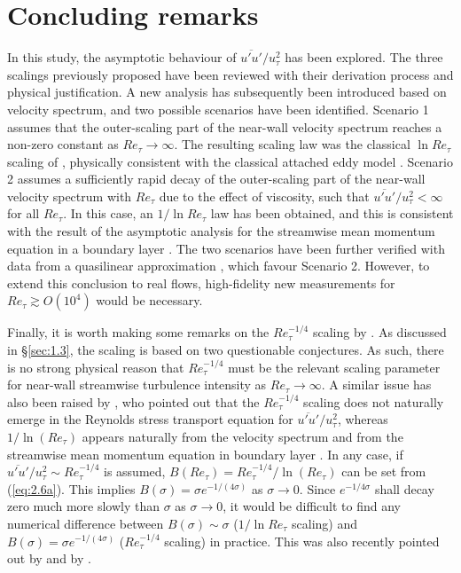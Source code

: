 \documentclass{jfm}
\begin{document}
\section{Concluding remarks}\label{sec:5}
In this study, the asymptotic behaviour of $\overline{u'u'}/u_\tau^2$ has been explored. The three scalings previously proposed \cite[]{Marusic2003,Monkewitz2015,Chen2021} have been reviewed with their derivation process and physical justification. A new analysis has subsequently been introduced based on velocity spectrum, and two possible scenarios have been identified. Scenario 1 assumes that the outer-scaling part of the near-wall velocity spectrum reaches a non-zero constant as $Re_\tau \rightarrow \infty$. The resulting scaling law was the classical $\ln Re_\tau$ scaling of \cite{Marusic2003}, physically consistent with the classical attached eddy model \cite[]{Townsend1976,Perry1986}. Scenario 2 assumes a sufficiently rapid decay of the outer-scaling part of the near-wall velocity spectrum with $Re_\tau$ due to the effect of viscosity, such that $\overline{u'u'}/u_\tau^2 < \infty$ for all $Re_\tau$. In this case, an $1/\ln Re_\tau$ law has been obtained, and this is consistent with the result of the asymptotic analysis for the streamwise mean momentum equation in a boundary layer \cite[]{Monkewitz2015}. The two scenarios have been further verified with data from a quasilinear approximation \cite{Holford2023b}, which favour Scenario 2. However, to extend this conclusion to real flows, high-fidelity new measurements for $Re_\tau \gtrsim O(10^4)$ would be necessary.

Finally, it is worth making some remarks on the $Re_\tau^{-1/4}$ scaling by \cite{Chen2021}. As discussed in \S\ref{sec:1.3}, the scaling is based on two questionable conjectures. As such, there is no strong physical reason that $Re_\tau^{-1/4}$ must be the relevant scaling parameter for near-wall streamwise turbulence intensity as $Re_\tau \rightarrow \infty$. A similar issue has also been raised by \cite{Monkewitz2022}, who pointed out that the $Re_\tau^{-1/4}$ scaling does not naturally emerge in the Reynolds stress transport equation for $\overline{u'u'}/u_\tau^2$, whereas $1/\ln(Re_\tau)$ appears naturally from the velocity spectrum and from the streamwise mean momentum equation in boundary layer \cite[]{Monkewitz2015}. In any case, if $\overline{u'u'}/u_\tau^2 \sim Re_\tau^{-1/4}$ is assumed, $B(Re_\tau)=Re_\tau^{-1/4}/\ln(Re_\tau)$ can be set from (\ref{eq:2.6a}). This implies $B(\sigma)=\sigma e^{-1/(4\sigma)}$ as $\sigma \rightarrow 0$. Since $e^{-1/4\sigma}$ shall decay zero much more slowly than $\sigma$ as $\sigma \rightarrow 0$, it would be difficult to find any numerical difference between $B(\sigma) \sim \sigma$ ($1/\ln Re_\tau$ scaling) and $B(\sigma)=\sigma e^{-1/(4\sigma)}$ ($Re_\tau^{-1/4}$ scaling) in practice. This was also recently pointed out by \cite{Monkewitz2022} and by \cite{Nagib2022}.
\end{document}
